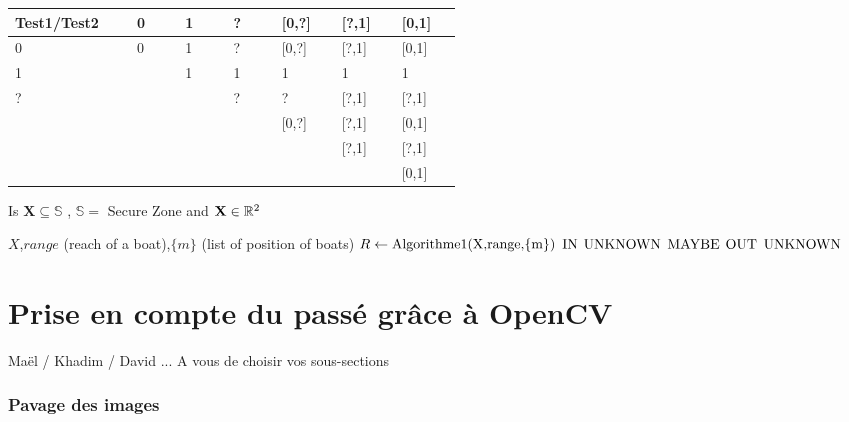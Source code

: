 \documentclass[10pt,a4paper]{report}
\begin{document}
\begin{center}
\begin{tabular}{|m{0.10\linewidth}|m{0.07\linewidth}|m{0.07\linewidth}|m{0.07\linewidth}|m{0.07\linewidth}|m{0.07\linewidth}|m{0.07\linewidth}|}
\hline
Test1/Test2 & 0 & 1 & ? & [0,?] &  [?,1] & [0,1] \\ \hline
          0 & 0 & 1 & ? & [0,?] &  [?,1] & [0,1]  \\ \hline
          1 &   & 1 & 1 &   1   &    1   &   1  \\ \hline
          ? &   &   & ? &   ?   &  [?,1] & [?,1] \\ \hline
      [0,?] &   &   &   & [0,?] &  [?,1] & [0,1] \\ \hline
      [?,1] &   &   &   &       &  [?,1] & [?,1] \\ \hline
      [0,1] &   &   &   &       &        & [0,1]  \\ \hline
    
   
\end{tabular}
\end{center}

\begin{algorithm}
\caption{Is $\mathbf{X} \subseteq \mathbb{S}$ , $\mathbb{S} =$ Secure Zone and $\mathbf{X} \in \mathbb{R^{\textnormal{\ensuremath{2}}}}$ }
\begin{algorithmic}
\REQUIRE $X$,$range $ (reach of a boat),$\{m\}$ (list of position of boats)
\STATE $R \leftarrow \textnormal{Algorithme1(X,range,\{m\})}$
\RETURN $\textnormal{IN}$
\RETURN $\textnormal{UNKNOWN}$
\RETURN $\textnormal{MAYBE}$
\RETURN $\textnormal{OUT}$
\ELSE
\RETURN $\textnormal{UNKNOWN}$
\ENDIF
\end{algorithmic}
\end{algorithm}


\section{Prise en compte du passé grâce à OpenCV}

Maël / Khadim / David  ... A vous de choisir vos sous-sections

\subsubsection{Pavage des images}
\end{document}
